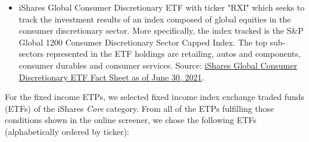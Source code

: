 \begin{itemize}
        \item iShares Global Consumer Discretionary ETF with ticker "RXI" which seeks to track the investment results of an index composed of global equities in the consumer discretionary sector. More specifically, the index tracked is the S{\&}P Global 1200 Consumer Discretionary Sector Capped Index. The top sub-sectors represented in the ETF holdings are retailing, autos and components, consumer durables and consumer services. Source: \href{https://www.ishares.com/us/literature/fact-sheet/rxi-ishares-global-consumer-discretionary-etf-fund-fact-sheet-en-us.pdf}{iShares Global Consumer Discretionary ETF Fact Sheet as of June 30, 2021}.%
    \end{itemize}
    
    For the fixed income ETPs, we selected fixed income index exchange traded funds (ETFs) of the iShares \textit{Core} category. From all of the ETPs fulfilling those conditions shown in the online screener, we chose the following ETFs (alphabetically ordered by ticker):
